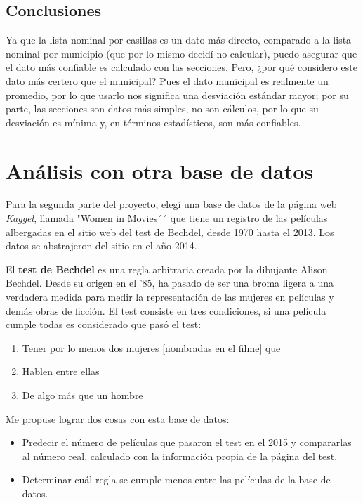 \documentclass{article}
\begin{document}
\subsection{Conclusiones}
 Ya que la lista nominal por casillas es un dato más directo, comparado a la lista nominal por municipio (que por lo mismo decidí no calcular), puedo asegurar que el dato más confiable es calculado con las secciones. Pero, ¿por qué considero este dato más certero que el municipal? Pues el dato municipal es realmente un promedio, por lo que usarlo nos significa una desviación estándar mayor; por su parte, las secciones son datos más simples, no son cálculos, por lo que su desviación es mínima y, en términos estadísticos, son más confiables.
 
\section{Análisis con otra base de datos}
Para la segunda parte del proyecto, elegí una base de datos de la página web \textit{Kaggel}, llamada "Women in Movies´´ \cite{Bed} que tiene un registro de las películas albergadas en el \href{https://bechdeltest.com}{sitio web} del test de Bechdel, desde 1970 hasta el 2013. Los datos se abstrajeron del sitio en el año 2014.

El \textbf{test de Bechdel} es una regla arbitraria creada por la dibujante Alison Bechdel. Desde su origen en el '85, ha pasado de ser una broma ligera a una verdadera medida para medir la representación de las mujeres en películas y demás obras de ficción. El test consiste en tres condiciones, si una película cumple todas es considerado que pasó el test:

\begin{enumerate}
    \item Tener por lo menos dos mujeres [nombradas en el filme] que
    \item Hablen entre ellas
    \item De algo más que un hombre
\end{enumerate}

Me propuse lograr dos cosas con esta base de datos:
\begin{itemize}
    \item Predecir el número de películas que pasaron el test en el 2015 y compararlas al número real, calculado con la información propia de la página del test.
    \item Determinar cuál regla se cumple menos entre las películas de la base de datos.
\end{itemize}
\end{document}
